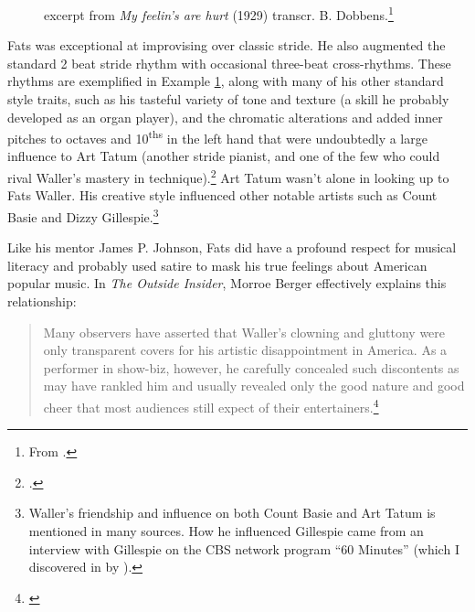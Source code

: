 \documentclass[11pt]{report}
\begin{document}
	
		\begin{figure}[ht]
			\centering
			\begin{minipage}{\textwidth}
				
				\caption{excerpt from \emph{My feelin's are hurt} (1929) transcr. B. Dobbens.\protect\footnote{\scriptsize From \cite[]{grove-book:waller}.}}
				\label{fig:hurt}
				

				{%
\parindent 0pt
\ifx\preLilyPondExample \undefined
\else
  \expandafter\preLilyPondExample
\fi
\def\lilypondbook{}%

\ifx\postLilyPondExample \undefined
\else
  \expandafter\postLilyPondExample
\fi
}


			\end{minipage}
		\end{figure}

	Fats was exceptional at improvising over classic stride. He also augmented the standard 2 beat stride rhythm with occasional three-beat cross-rhythms. These rhythms are exemplified in Example \ref{fig:hurt}, along with many of his other standard style traits, such as his tasteful variety of tone and texture (a skill he probably developed as an organ player), and the chromatic alterations and added inner pitches to octaves and 10\textsuperscript{ths} in the left hand that were undoubtedly a large influence to Art Tatum (another stride pianist, and one of the few who could rival Waller's mastery in technique).\footnote{\cite[40]{grove-book:waller}.} Art Tatum wasn't alone in looking up to Fats Waller. His creative style influenced other notable artists such as Count Basie and Dizzy Gillespie.\footnote{Waller's friendship and influence on both Count Basie and Art Tatum is mentioned in many sources. How he influenced Gillespie came from an interview with Gillespie on the CBS network program ``60 Minutes'' (which I discovered in  by \cite{transcriptions}).}


	\label{sec:respect}
	Like his mentor James P. Johnson, Fats did have a profound respect for musical literacy and probably used satire to mask his true feelings about American popular music. In \emph{The Outside Insider}, Morroe Berger effectively explains this relationship:
	\begin{quote}
		Many observers have asserted that Waller's clowning and gluttony were only transparent covers for his artistic disappointment in America. As a performer in show-biz, however, he carefully concealed such discontents as may have rankled him and usually revealed only the good nature and good cheer that most audiences still expect of their entertainers.\footnote{\cite[4]{outside-insider}}
	\end{quote}
\end{document}

